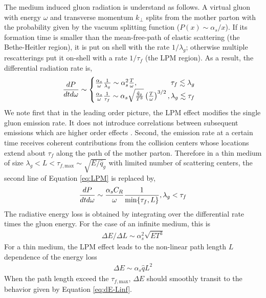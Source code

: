 \documentclass[aps, prc, reprint, amsmath, groupedaddress, nofootinbib]{revtex4-1}
\begin{document}
The medium induced gluon radiation is understand as follows. 
A virtual gluon with energy $\omega$ and transverse momentum $k_\perp$ splits from the mother parton with the probability given by the vacuum splitting function ($P(x) \sim \alpha_s/x$).
If its formation time is smaller than the mean-free-path of elastic scattering (the Bethe-Heitler region), it is put on shell with the rate $1/\lambda_g$; otherwise multiple rescatterings put it on-shell with a rate $1/\tau_f$ (the LPM region).
As a result, the differential radiation rate is,
\begin{eqnarray}\label{eq:LPM}
\frac{dP}{dt d\omega} \sim \begin{cases}
 \frac{\alpha_s}{\omega} \frac{1}{\lambda_g} \sim \alpha_s^2  \frac{T}{\omega}, \hfill \tau_f \lesssim \lambda_g\\
 \frac{\alpha_s}{\omega} \frac{1}{\tau_f}\sim \alpha_s \sqrt{\frac{\hat{q}_g}{T^3}} \left(\frac{T}{\omega}\right)^{3/2}, \hfill \lambda_g \lesssim \tau_f
\end{cases}
\end{eqnarray}
We note first that in the leading order picture, the LPM effect modifies the single gluon emission rate. 
It does not introduce correlations between subsequent emissions which are higher order effects \cite{Arnold:2016jnq}.
Second, the emission rate at a certain time receives coherent contributions from the collision centers whose locations extend about $\tau_f$ along the path of the mother parton.
Therefore in a thin medium of size $\lambda_g < L< \tau_{f,\textrm{max}} \sim \sqrt{E/\hat{q}_g}$ with limited number of scattering centers, the second line of Equation \ref{eq:LPM} is replaced by,
\begin{eqnarray}
\frac{dP}{dt d\omega} \sim 
 \frac{\alpha_s C_R}{\omega} \frac{1}{\min\{\tau_f,L\}}, \hfill \lambda_g < \tau_f
\end{eqnarray}
The radiative energy loss is obtained by integrating over the differential rate times the gluon energy. 
For the case of an infinite medium, this is
\begin{eqnarray}\label{eq:dE-Linf}
\Delta E/\Delta L \sim \alpha_s^2 \sqrt{ET^3}
\end{eqnarray}
For a thin medium, the LPM effect leads to the non-linear path length $L$ dependence of the energy loss
\begin{eqnarray}\label{eq:dE-Lfinite}
\Delta E \sim \alpha_s \hat{q} L^2
\end{eqnarray}
When the path length exceed the $\tau_{f,\textrm{max}}$, $\Delta E$ should smoothly transit to the behavior given by Equation \ref{eq:dE-Linf}.
\end{document}
